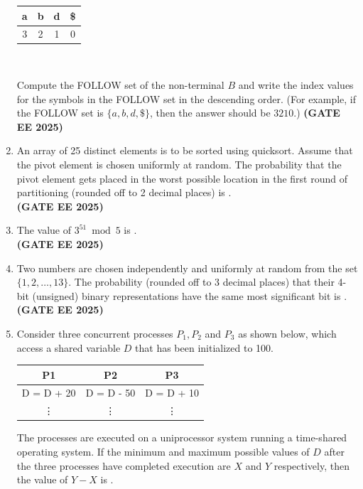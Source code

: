 \documentclass[journal,12pt,onecolumn]{IEEEtran}
\theoremstyle{remark}
\begin{document}
\begin{enumerate}
\begin{center}
\begin{tabular}{|c|c|c|c|}
\hline
a & b & d & \$ \\
\hline
3 & 2 & 1 & 0 \\
\hline
\end{tabular}\\
\end{center}
Compute the FOLLOW set of the non-terminal $B$ and write the index values for the symbols in the FOLLOW set in the descending order. (For example, if the FOLLOW set is $\{a, b, d, \$\}$, then the answer should be $3210$.) 
\hfill \textbf{(GATE EE 2025)}
\item  An array of 25 distinct elements is to be sorted using quicksort. Assume that the pivot element is chosen uniformly at random. The probability that the pivot element gets placed in the worst possible location in the first round of partitioning (rounded off to 2 decimal places) is \underline{\hspace{3cm}}. \\[1em]
\hfill \textbf{(GATE EE 2025)}
\item  The value of $3^{51} \bmod 5$ is \underline{\hspace{3cm}}. \\[1em]

\hfill \textbf{(GATE EE 2025)}
\item  Two numbers are chosen independently and uniformly at random from the set $\{1, 2, \dots, 13\}$. The probability (rounded off to 3 decimal places) that their 4-bit (unsigned) binary representations have the same most significant bit is \underline{\hspace{3cm}}. \\[1em]

\hfill \textbf{(GATE EE 2025)}
\item Consider three concurrent processes $P_1, P_2$ and $P_3$ as shown below, which access a shared variable $D$ that has been initialized to 100.\\
\begin{center}
    


\begin{tabular}{|c|c|c|}
\hline
P1 & P2 & P3 \\
\hline
D = D + 20 & D = D - 50 & D = D + 10 \\
\vdots & \vdots & \vdots \\
\hline
\end{tabular}

\end{center}
The processes are executed on a uniprocessor system running a time-shared operating system. If the minimum and maximum possible values of $D$ after the three processes have completed execution are $X$ and $Y$ respectively, then the value of $Y - X$ is \underline{\hspace{3cm}}. \\


\end{enumerate}
\end{document}
